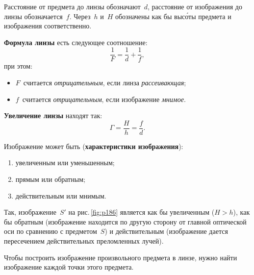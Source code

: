 \documentclass[main.tex]{subfiles}
\begin{document}
Расстояние от предмета до линзы обозначают~$d$, расстояние от изображения до линзы обозначается~$f$. Через~$h$ и~$H$ обозначены как бы выс\'оты предмета и изображения соответственно.

\textbf{Формула линзы} есть следующее соотношение:
\begin{equation}
    \frac{1}{F}=\frac{1}{d}+\frac{1}{f},
\end{equation}
при этом: 
\begin{itemize}
    \item $F$~считается \emph{отрицательным}, если линза \emph{рассеивающая};
    \item $f$~считается \emph{отрицательным}, если изображение \emph{мнимое}.
\end{itemize}

\textbf{Увеличение линзы} находят так:
\begin{equation}
    \Gamma=\frac{H}{h}=\frac{f}{d}.
\end{equation}

Изображение может быть (\textbf{характеристики изображения}):
\begin{enumerate}
    \item [1)] увеличенным или уменьшенным;
    \item [2)] прямым или обратным;
    \item [3)] действительным или мнимым.
\end{enumerate}

Так, изображение~$S'$ на рис.\,\ref{fig:p186} является как бы увеличенным ($H>h$), как бы обратным (изображение находится по другую сторону от главной оптической оси по сравнению с предметом~$S$) и действительным (изображение дается пересечением действительных преломленных лучей).

Чтобы построить изображение произвольного предмета в линзе, нужно найти изображение каждой точки этого предмета.



 
\end{document}
